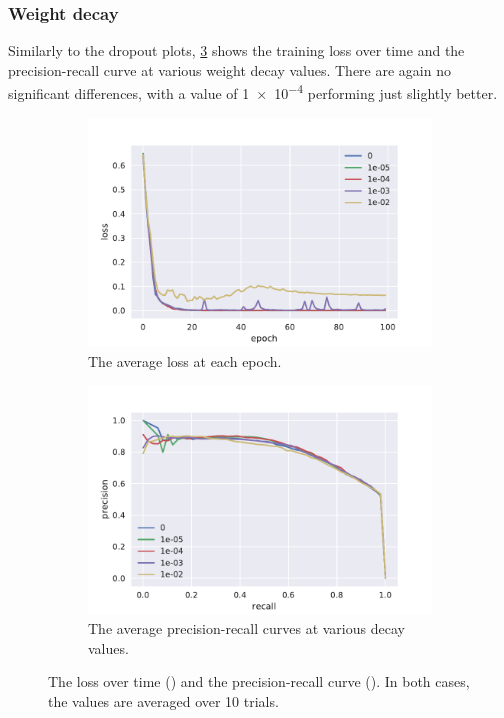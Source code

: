\FloatBarrier%
\subsubsection{Weight decay}
Similarly to the dropout plots, \cref{fig:decay_plots} shows the training loss
over time and the precision-recall curve at various weight decay values. There
are again no significant differences, with a value of \num{1e-4} performing just
slightly better.

\begin{figure}[tb]
  \centering
  \begin{subfigure}[t]{0.49\textwidth}
    \centering
    \includegraphics[width=\textwidth]{./figures/results/decay/losses.pdf}
    \caption{The average loss at each epoch.\\}%
    \label{fig:decay_loss}
  \end{subfigure}
  \begin{subfigure}[t]{0.49\textwidth}
    \centering
    \includegraphics[width=\textwidth]{./figures/results/decay/pr.pdf}
    \caption{The average precision-recall curves at various decay values.}%
    \label{fig:decay_pr}
  \end{subfigure}
  \caption{The loss over time () and the
    precision-recall curve (). In both cases, the values are
    averaged over 10 trials.}%
    \label{fig:decay_plots}
\end{figure}

